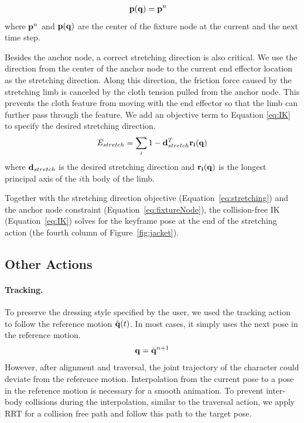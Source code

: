 \begin{align}
  \label{eq:fixtureNode}
  \nonumber  \mathbf{p}(\mathbf{q})& = \mathbf{p}^n
\end{align}
where $\mathbf{p}^n$ and $\mathbf{p(q)}$ are the center of the fixture node at the current and the next time step.

Besides the anchor node, a correct stretching direction is also critical. We use the direction from the center of the anchor node to the current end effector location as the stretching direction. Along this direction, the friction force caused by the stretching limb is canceled by the cloth tension pulled from the anchor node. This prevents the cloth feature from moving with the end effector so that the limb can further pass through the feature. We add an objective term to Equation \ref{eq:IK} to specify the desired stretching direction.
\begin{equation}
  E_{stretch} = \sum_i1 - \mathbf{d}_{stretch}^T\mathbf{r_i(q)}
  \label{eq:stretching}
\end{equation}
where $\mathbf{d}_{stretch}$ is the desired stretching direction and $\mathbf{r_i(q)}$ is the longest principal axis of the $i$th body of the limb. 

Together with the stretching direction objective (Equation~\ref{eq:stretching}) and the anchor node constraint (Equation~\ref{eq:fixtureNode}), the collision-free IK (Equation~\ref{eq:IK}) solves for the keyframe pose at the end of the stretching action (the fourth column of Figure~\ref{fig:jacket}).

\subsection{Other Actions}

\paragraph{Tracking.} To preserve the dressing style specified by the user, we used the tracking action to follow the reference motion $\hat{\mathbf{q}}(t)$. In most cases, it simply uses the next pose in the reference motion.
\begin{displaymath}
\mathbf{q} = \hat{\mathbf{q}}^{n+1}
\end{displaymath}
However, after alignment and traversal, the joint trajectory of the character could deviate from the reference motion. Interpolation from the current pose to a pose in the reference motion is necessary for a smooth animation. To prevent inter-body collisions during the interpolation, similar to the traversal action, we apply RRT for a collision free path and follow this path to the target pose.


